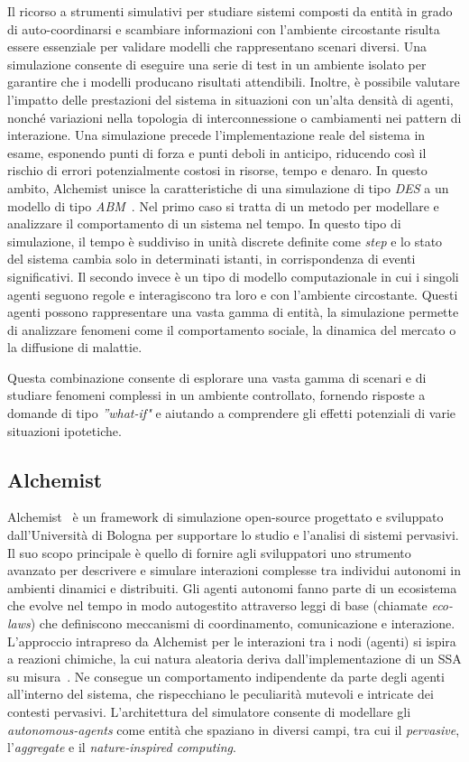 Il ricorso a strumenti simulativi per studiare sistemi composti da entità in grado di auto-coordinarsi e scambiare informazioni con l'ambiente circostante risulta essere essenziale per validare modelli che rappresentano scenari diversi. Una simulazione consente di eseguire una serie di test in un ambiente isolato per garantire che i modelli producano risultati attendibili. Inoltre, è possibile valutare l'impatto delle prestazioni del sistema in situazioni con un'alta densità di agenti, nonché variazioni nella topologia di interconnessione o cambiamenti nei pattern di interazione. Una simulazione precede l'implementazione reale del sistema in esame, esponendo punti di forza e punti deboli in anticipo, riducendo così il rischio di errori potenzialmente costosi in risorse, tempo e denaro.
In questo ambito, Alchemist unisce la caratteristiche di una simulazione di tipo \textit{\ac{DES}} a un modello di tipo \textit{\ac{ABM}}~\cite{PMV2011}. Nel primo caso si tratta di un metodo per modellare e analizzare il comportamento di un sistema nel tempo. In questo tipo di simulazione, il tempo è suddiviso in unità discrete definite come \textit{step} e lo stato del sistema cambia solo in determinati istanti, in corrispondenza di eventi significativi.
Il secondo invece è un tipo di modello computazionale in cui i singoli agenti seguono regole e interagiscono tra loro e con l'ambiente circostante. Questi agenti possono rappresentare una vasta gamma di entità, la simulazione permette di analizzare fenomeni come il comportamento sociale, la dinamica del mercato o la diffusione di malattie. 

Questa combinazione consente di esplorare una vasta gamma di scenari e di studiare fenomeni complessi in un ambiente controllato, fornendo risposte a domande di tipo \textit{''what-if"} e aiutando a comprendere gli effetti potenziali di varie situazioni ipotetiche.
\subsection{Alchemist}
Alchemist~\cite{Pianini_2013} è un framework di simulazione open-source progettato e sviluppato dall'Università di Bologna per supportare lo studio e l'analisi di sistemi pervasivi.  Il suo scopo principale è quello di fornire agli sviluppatori uno strumento avanzato per descrivere e simulare interazioni complesse tra individui autonomi in ambienti dinamici e distribuiti. Gli agenti autonomi fanno parte di un ecosistema che evolve nel tempo in modo autogestito attraverso leggi di base (chiamate \textit{eco-laws}) che definiscono meccanismi di coordinamento, comunicazione e interazione. 
L'approccio intrapreso da Alchemist per le interazioni tra i nodi (agenti) si ispira a reazioni chimiche, la cui natura aleatoria deriva dall'implementazione di un \ac{SSA} su misura~\cite{PMV2011}. Ne consegue  un comportamento indipendente da parte degli agenti all'interno del sistema, che rispecchiano le peculiarità mutevoli e intricate dei contesti pervasivi.
L'architettura del simulatore consente di modellare gli \textit{autonomous-agents} come entità che spaziano in diversi campi, tra cui il \textit{pervasive}, l'\textit{aggregate} e il \textit{nature-inspired computing}.

